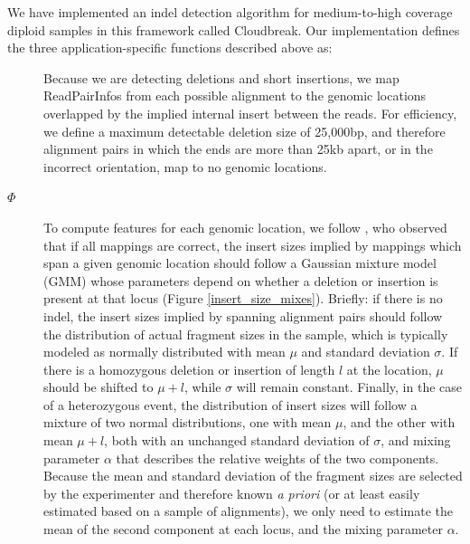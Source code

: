 \documentclass[11pt]{article}
\begin{document}
We have implemented an indel detection algorithm for medium-to-high coverage diploid samples in this framework called Cloudbreak. Our implementation defines the three application-specific functions described above as:
\begin{description}
\item[] Because we are detecting deletions and short insertions, we map ReadPairInfos from each possible alignment to the genomic locations overlapped by the implied internal insert between the reads. For efficiency, we define a maximum detectable deletion size of 25,000bp, and therefore alignment pairs in which the ends are more than 25kb apart, or in the incorrect orientation, map to no genomic locations.
\item[$\Phi$] To compute features for each genomic location, we follow \textcite{Lee:2009da}, who observed that if all mappings are correct, the insert sizes implied by mappings which span a given genomic location should follow a Gaussian mixture model (GMM) whose parameters depend on whether a deletion or insertion is present at that locus (Figure \ref{insert_size_mixes}). Briefly: if there is no indel, the insert sizes implied by spanning alignment pairs should follow the distribution of actual fragment sizes in the sample, which is typically modeled as normally distributed with mean $\mu$ and standard deviation $\sigma$. If there is a homozygous deletion or insertion of length $l$ at the location, $\mu$ should be shifted to $\mu + l$, while $\sigma$ will remain constant. Finally, in the case of a heterozygous event, the distribution of insert sizes will follow a mixture of two normal distributions, one with mean $\mu$, and the other with mean $\mu + l$, both with an unchanged standard deviation of $\sigma$, and mixing parameter $\alpha$ that describes the relative weights of the two components. Because the mean and standard deviation of the fragment sizes are selected by the experimenter and therefore known \emph{a priori} (or at least easily estimated based on a sample of alignments), we only need to estimate the mean of the second component at each locus, and the mixing parameter $\alpha$.


\end{description}
\end{document}

